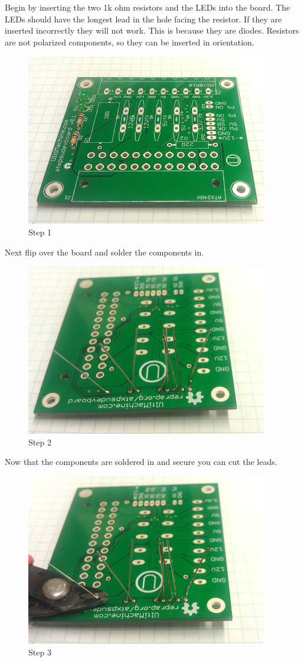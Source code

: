 Begin by inserting the two 1k ohm resistors and the LEDs into the board.
The LEDs should have the longest lead in the hole facing the resistor.
If they are inserted incorrectly they will not work. This is because
they are diodes. Resistors are not polarized components, so they can be
inserted in orientation.

\begin{figure}[htbp]
\centering
\includegraphics{./png/step-01.png}
\caption{Step 1}
\end{figure}

Next flip over the board and solder the components in.

\begin{figure}[htbp]
\centering
\includegraphics{./png/step-02.png}
\caption{Step 2}
\end{figure}

Now that the components are soldered in and secure you can cut the
leads.

\begin{figure}[htbp]
\centering
\includegraphics{./png/step-03.png}
\caption{Step 3}
\end{figure}

